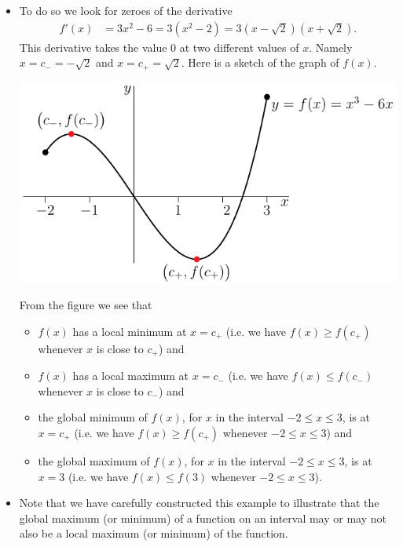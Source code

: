 \begin{eg}
\begin{itemize}
 \item To do so we look for zeroes of the derivative
\begin{align*}
  f'(x) &= 3x^2-6 = 3(x^2-2) = 3(x-\sqrt{2})(x+\sqrt{2}).
\end{align*}
This derivative takes the value $0$ at two different values of $x$. Namely
$x=c_-=-\sqrt{2}$ and $x=c_+=\sqrt{2}$. Here is a sketch of the graph of
$f(x)$.
\begin{efig}
\begin{center}
   \includegraphics{localMaxMinA}
\end{center}
\end{efig}
From the figure we see that
\begin{itemize}
\item $f(x)$ has a local minimum at $x=c_+$ (i.e. we have $f(x)\ge f(c_+)$
whenever $x$ is close to $c_+$) and
\item $f(x)$ has a local maximum at $x=c_-$ (i.e. we have $f(x)\le f(c_-)$
whenever $x$ is close to $c_-$) and
\item the global minimum of $f(x)$, for $x$ in the interval $-2\le x\le 3$, is
at $x=c_+$ (i.e. we have $f(x)\ge f(c_+)$ whenever $-2\le x\le 3$) and
\item the global maximum of $f(x)$, for $x$ in the interval $-2\le x\le 3$, is
at $x=3$ (i.e. we have $f(x)\le f(3)$ whenever $-2\le x\le 3$).
\end{itemize}
\item Note that we have carefully constructed this example to illustrate that
the global maximum (or minimum) of a function on an interval may or may not also
be a local maximum (or minimum) of the function.
\end{itemize}

\end{eg}

